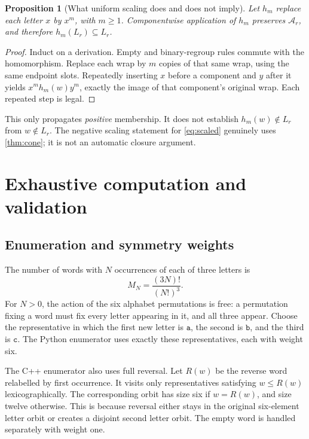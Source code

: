 \documentclass[11pt,letterpaper]{article}
\numberwithin{equation}{section}
\newtheorem{proposition}[theorem]{Proposition}
\theoremstyle{definition}
\theoremstyle{remark}
\newcommand{\A}{\mathcal A}
\renewcommand{\aa}{\mathtt a}
\newcommand{\bb}{\mathtt b}
\newcommand{\cc}{\mathtt c}
\begin{document}
\begin{proposition}[What uniform scaling does and does not imply]
\label{prop:dilation}
Let \(h_m\) replace each letter \(x\) by \(x^m\), with \(m\geq1\).
Componentwise application of \(h_m\) preserves \(\A_r\), and therefore
\(h_m(L_r)\subseteq L_r\).
\end{proposition}
\begin{proof}
Induct on a derivation. Empty and binary-regroup rules commute with the
homomorphism. Replace each wrap by \(m\) copies of that same wrap,
using the same endpoint slots. Repeatedly inserting \(x\) before a
component and \(y\) after it yields \(x^m h_m(w)y^m\), exactly the
image of that component's original wrap. Each repeated step is legal.
\end{proof}

This only propagates \emph{positive} membership. It does not establish
\(h_m(w)\notin L_r\) from \(w\notin L_r\). The negative scaling
statement for \eqref{eq:scaled} genuinely uses \cref{thm:cone}; it is
not an automatic closure argument.

\section{Exhaustive computation and validation}
\label{sec:experiments}

\subsection{Enumeration and symmetry weights}
The number of words with \(N\) occurrences of each of three letters is
\begin{equation}\label{eq:multinomial}
 M_N=\frac{(3N)!}{(N!)^3}.
\end{equation}
For \(N>0\), the action of the six alphabet permutations is free:
a permutation fixing a word must fix every letter appearing in it,
and all three appear. Choose the representative in which the first
new letter is \(\aa\), the second is \(\bb\), and the third is
\(\cc\). The Python enumerator uses exactly these representatives,
each with weight six.

The C++ enumerator also uses full reversal. Let \(R(w)\) be the reverse
word relabelled by first occurrence. It visits only representatives
satisfying \(w\leq R(w)\) lexicographically. The corresponding orbit
has size six if \(w=R(w)\), and size twelve otherwise. This is because
reversal either stays in the original six-element letter orbit or
creates a disjoint second letter orbit. The empty word is handled
separately with weight one.
\end{document}
